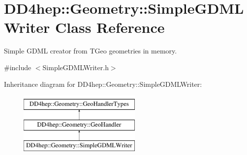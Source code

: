 \hypertarget{class_d_d4hep_1_1_geometry_1_1_simple_g_d_m_l_writer}{}\section{D\+D4hep\+:\+:Geometry\+:\+:Simple\+G\+D\+M\+L\+Writer Class Reference}
\label{class_d_d4hep_1_1_geometry_1_1_simple_g_d_m_l_writer}


Simple G\+D\+ML creator from T\+Geo geometries in memory.  




{\ttfamily \#include $<$Simple\+G\+D\+M\+L\+Writer.\+h$>$}

Inheritance diagram for D\+D4hep\+:\+:Geometry\+:\+:Simple\+G\+D\+M\+L\+Writer\+:\begin{figure}[H]
\begin{center}
\leavevmode
\includegraphics[height=3.000000cm]{class_d_d4hep_1_1_geometry_1_1_simple_g_d_m_l_writer}
\end{center}
\end{figure}
